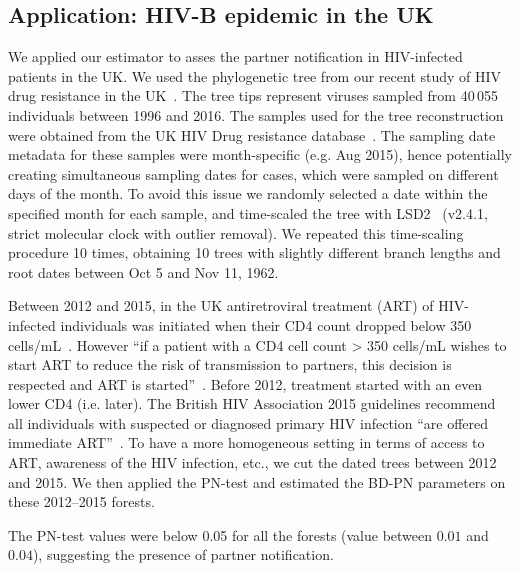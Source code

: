 \documentclass[a4paper,10pt]{article}
\begin{document}
\subsection{Application: HIV-B epidemic in the UK}
We applied our estimator to asses the partner notification in HIV-infected patients in the UK. We used the phylogenetic tree from our recent study of HIV drug resistance in the UK~\citep{zhukovaModelingDrugResistance2023}. The tree tips represent viruses sampled from 40\,055 individuals between 1996 and 2016. The samples used for the tree reconstruction were obtained from the UK HIV Drug resistance database~\citep{Dunn2007}. The sampling date metadata for these samples were month-specific (e.g. Aug 2015), hence potentially creating simultaneous sampling dates for cases, which were sampled on different days of the month. To avoid this issue we randomly selected a date within the specified month for each sample, and time-scaled the tree with LSD2~\citep{To2016} (v2.4.1, strict molecular clock with outlier removal). We repeated this time-scaling procedure 10 times, obtaining 10 trees with slightly different branch lengths and root dates between Oct 5 and Nov 11, 1962.

Between 2012 and 2015, in the UK antiretroviral treatment (ART) of HIV-infected individuals  was initiated when their CD4 count dropped below 350 cells/mL~\citep{williamsBritishHIVAssociation2012}. However ``if a patient with a CD4 cell count > 350 cells/mL wishes to start ART to reduce the risk of transmission to partners, this decision is respected and ART is started''~\citep{williamsBritishHIVAssociation2012}. Before 2012, treatment started with an even lower CD4 (i.e. later). The British HIV Association 2015 guidelines recommend all individuals with suspected or diagnosed primary HIV infection ``are offered immediate ART''~\citep{churchillBritishHIVAssociation2016}. To have a more homogeneous setting in terms of access to ART, awareness of the HIV infection, etc., we cut the dated trees between 2012 and 2015. We then applied the PN-test and estimated the BD-PN parameters on these 2012--2015 forests. 

The PN-test values were below 0.05 for all the forests (value between $0.01$ and $0.04$), suggesting the presence of partner notification.
\end{document}
